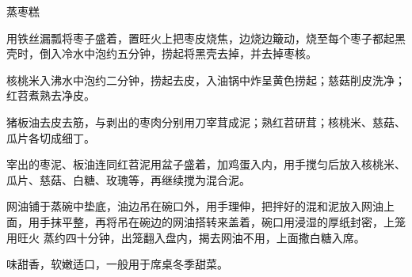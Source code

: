 %
%
%
%
%
%
%
\begin{recipe}{蒸枣糕}

\ingredients


\preparation

\step 用铁丝漏瓢将枣子盛着，置旺火上把枣皮烧焦，边烧边簸动，烧至每个枣子都起黑
壳时，倒入冷水中泡约五分钟，捞起将黑壳去掉，并去掉枣核。

\step 核桃米入沸水中泡约二分钟，捞起去皮，入油锅中炸呈黄色捞起；慈菇削皮洗净；
红苕煮熟去净皮。

\step 猪板油去皮去筋，与剥出的枣肉分别用刀宰茸成泥；熟红苕研茸；核桃米、慈菇、
瓜片各切成细丁。

\step 宰出的枣泥、板油连同红苕泥用盆子盛着，加鸡蛋入内，用手搅匀后放入核桃米、
瓜片、慈菇、白糖、玫瑰等，再继续搅为混合泥。

\step 网油铺于蒸碗中垫底，油边吊在碗口外，用手理伸，把拌好的混和泥放入网油上
面，用手抹平整，再将吊在碗边的网油搭转来盖着，碗口用浸湿的厚纸封密，上笼用旺火
蒸约四十分钟，出笼翻入盘内，揭去网油不用，上面撒白糖入席。

\features

味甜香，软嫩适口，一般用于席桌冬季甜菜。

\end{recipe}

